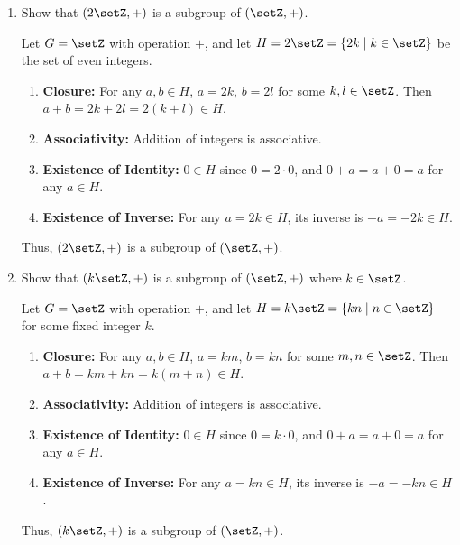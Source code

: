 \begin{enumerate}
  \item Show that \((2\setZ, +)\) is a subgroup of \((\setZ, +)\).
    \begin{subprove}
      Let \(G = \setZ\) with operation \(+\), and let \(H = 2\setZ = \{2k \mid k \in \setZ\}\) be the set of even integers.
      \begin{enumerate}
        \item \textbf{Closure:} For any \(a, b \in H\), \(a = 2k\), \(b = 2l\) for some \(k, l \in \setZ\). Then \(a + b = 2k + 2l = 2(k + l) \in H\).
        \item \textbf{Associativity:} Addition of integers is associative.
        \item \textbf{Existence of Identity:} \(0 \in H\) since \(0 = 2 \cdot 0\), and \(0 + a = a + 0 = a\) for any \(a \in H\).
        \item \textbf{Existence of Inverse:} For any \(a = 2k \in H\), its inverse is \(-a = -2k \in H\).
      \end{enumerate}
      Thus, \((2\setZ, +)\) is a subgroup of \((\setZ, +)\).
    \end{subprove}
  
  \item Show that \((k\setZ, +)\) is a subgroup of \((\setZ, +)\) where $k\in\setZ$.
    \begin{subprove}
      Let \(G = \setZ\) with operation \(+\), and let \(H = k\setZ = \{kn \mid n \in \setZ\}\) for some fixed integer \(k\).
      \begin{enumerate}
        \item \textbf{Closure:} For any \(a, b \in H\), \(a = km\), \(b = kn\) for some \(m, n \in \setZ\). Then \(a + b = km + kn = k(m + n) \in H\).
        \item \textbf{Associativity:} Addition of integers is associative.
        \item \textbf{Existence of Identity:} \(0 \in H\) since \(0 = k \cdot 0\), and \(0 + a = a + 0 = a\) for any \(a \in H\).
        \item \textbf{Existence of Inverse:} For any \(a = kn \in H\), its inverse is \(-a = -kn \in H\).
      \end{enumerate}
      Thus, \((k\setZ, +)\) is a subgroup of \((\setZ, +)\).
    \end{subprove}

\end{enumerate}














